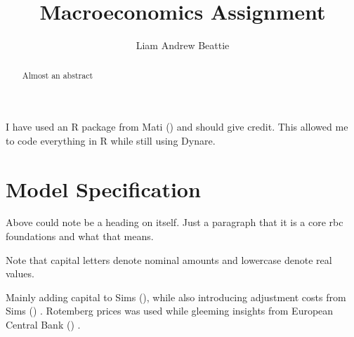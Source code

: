 \documentclass[11pt,preprint]{elsarticle}
\numberwithin{equation}{section}
\numberwithin{figure}{section}
\numberwithin{table}{section}
\begin{document}
\begin{frontmatter}  %

\title{Macroeconomics Assignment}





\author[Add1]{Liam Andrew Beattie}





\address[Add1]{Macroeconomics 871, Stellenbosch University, South
Africa}


\begin{abstract}
\small{
Almost an abstract
}
\end{abstract}

\vspace{1cm}





\vspace{0.5cm}

\end{frontmatter}

\setcounter{footnote}{0}



\pagestyle{fancy}
\chead{}
\rhead{}
\lfoot{}
\lhead{}
\cfoot{}


\headsep 35pt %




I have used an R package from Mati () and
should give credit. This allowed me to code everything in R while still
using Dynare.

\section{Model Specification}\label{model-specification}

Above could note be a heading on itself. Just a paragraph that it is a
core rbc foundations and what that means.

Note that capital letters denote nominal amounts and lowercase denote
real values.

Mainly adding capital to Sims
(), while also introducing
adjustment costs from Sims () .
Rotemberg prices was used while gleeming insights from European Central
Bank () .
\end{document}
